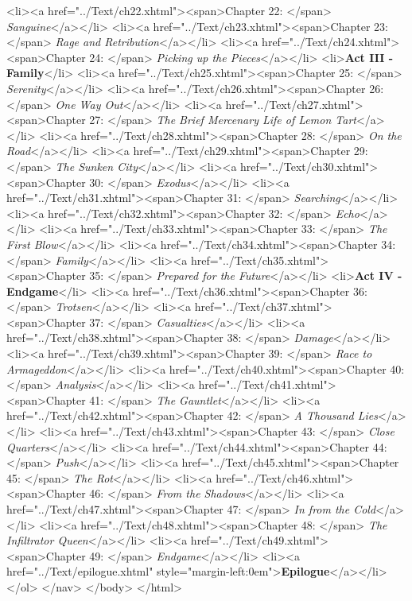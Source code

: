 		<li><a href="../Text/ch22.xhtml"><span>Chapter 22: </span>\textit{ Sanguine}</a></li>
		<li><a href="../Text/ch23.xhtml"><span>Chapter 23: </span>\textit{ Rage and Retribution}</a></li>
		<li><a href="../Text/ch24.xhtml"><span>Chapter 24: </span>\textit{ Picking up the Pieces}</a></li>
				<li>\textbf{Act III - Family}</li>
		<li><a href="../Text/ch25.xhtml"><span>Chapter 25: </span>\textit{ Serenity}</a></li>
		<li><a href="../Text/ch26.xhtml"><span>Chapter 26: </span>\textit{ One Way Out}</a></li>
		<li><a href="../Text/ch27.xhtml"><span>Chapter 27: </span>\textit{ The Brief Mercenary Life of Lemon Tart}</a></li>
		<li><a href="../Text/ch28.xhtml"><span>Chapter 28: </span>\textit{ On the Road}</a></li>
		<li><a href="../Text/ch29.xhtml"><span>Chapter 29: </span>\textit{ The Sunken City}</a></li>
		<li><a href="../Text/ch30.xhtml"><span>Chapter 30: </span>\textit{ Exodus}</a></li>
		<li><a href="../Text/ch31.xhtml"><span>Chapter 31: </span>\textit{ Searching}</a></li>
		<li><a href="../Text/ch32.xhtml"><span>Chapter 32: </span>\textit{ Echo}</a></li>
		<li><a href="../Text/ch33.xhtml"><span>Chapter 33: </span>\textit{ The First Blow}</a></li>
		<li><a href="../Text/ch34.xhtml"><span>Chapter 34: </span>\textit{ Family}</a></li>
		<li><a href="../Text/ch35.xhtml"><span>Chapter 35: </span>\textit{ Prepared for the Future}</a></li>
				<li>\textbf{Act IV - Endgame}</li>
    <li><a href="../Text/ch36.xhtml"><span>Chapter 36: </span>\textit{ Trotsen}</a></li>
		<li><a href="../Text/ch37.xhtml"><span>Chapter 37: </span>\textit{ Casualties}</a></li>
		<li><a href="../Text/ch38.xhtml"><span>Chapter 38: </span>\textit{ Damage}</a></li>
		<li><a href="../Text/ch39.xhtml"><span>Chapter 39: </span>\textit{ Race to Armageddon}</a></li>
		<li><a href="../Text/ch40.xhtml"><span>Chapter 40: </span>\textit{ Analysis}</a></li>
		<li><a href="../Text/ch41.xhtml"><span>Chapter 41: </span>\textit{ The Gauntlet}</a></li>
		<li><a href="../Text/ch42.xhtml"><span>Chapter 42: </span>\textit{ A Thousand Lies}</a></li>
		<li><a href="../Text/ch43.xhtml"><span>Chapter 43: </span>\textit{ Close Quarters}</a></li>
		<li><a href="../Text/ch44.xhtml"><span>Chapter 44: </span>\textit{ Push}</a></li>
		<li><a href="../Text/ch45.xhtml"><span>Chapter 45: </span>\textit{ The Rot}</a></li>
		<li><a href="../Text/ch46.xhtml"><span>Chapter 46: </span>\textit{ From the Shadows}</a></li>
		<li><a href="../Text/ch47.xhtml"><span>Chapter 47: </span>\textit{ In from the Cold}</a></li>
		<li><a href="../Text/ch48.xhtml"><span>Chapter 48: </span>\textit{ The Infiltrator Queen}</a></li>
		<li><a href="../Text/ch49.xhtml"><span>Chapter 49: </span>\textit{ Endgame}</a></li>
				<li><a href="../Text/epilogue.xhtml" style="margin-left:0em">\textbf{Epilogue}</a></li>
	</ol>
</nav>
</body>
</html>